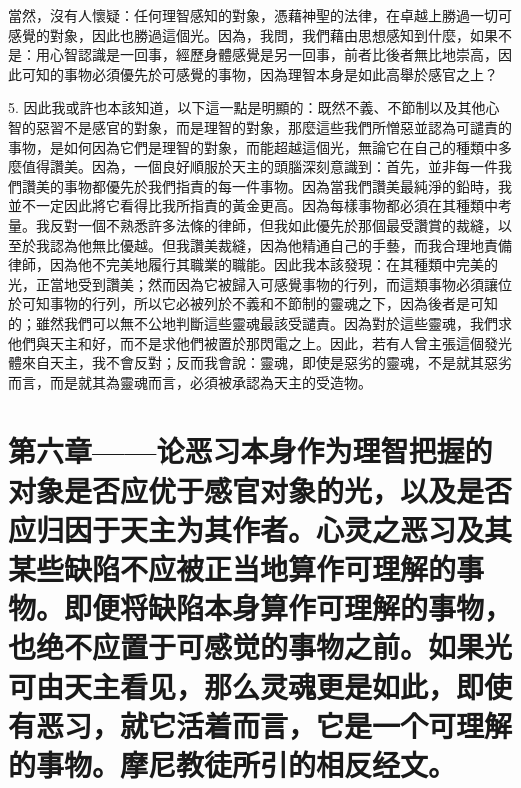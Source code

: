 當然，沒有人懷疑：任何理智感知的對象，憑藉神聖的法律，在卓越上勝過一切可感覺的對象，因此也勝過這個光。因為，我問，我們藉由思想感知到什麼，如果不是：用心智認識是一回事，經歷身體感覺是另一回事，前者比後者無比地崇高，因此可知的事物必須優先於可感覺的事物，因為理智本身是如此高舉於感官之上？\par

5. 因此我或許也本該知道，以下這一點是明顯的：既然不義、不節制以及其他心智的惡習不是感官的對象，而是理智的對象，那麼這些我們所憎惡並認為可譴責的事物，是如何因為它們是理智的對象，而能超越這個光，無論它在自己的種類中多麼值得讚美。因為，一個良好順服於天主的頭腦深刻意識到：首先，並非每一件我們讚美的事物都優先於我們指責的每一件事物。因為當我們讚美最純淨的鉛時，我並不一定因此將它看得比我所指責的黃金更高。因為每樣事物都必須在其種類中考量。我反對一個不熟悉許多法條的律師，但我如此優先於那個最受讚賞的裁縫，以至於我認為他無比優越。但我讚美裁縫，因為他精通自己的手藝，而我合理地責備律師，因為他不完美地履行其職業的職能。因此我本該發現：在其種類中完美的光，正當地受到讚美；然而因為它被歸入可感覺事物的行列，而這類事物必須讓位於可知事物的行列，所以它必被列於不義和不節制的靈魂之下，因為後者是可知的；雖然我們可以無不公地判斷這些靈魂最該受譴責。因為對於這些靈魂，我們求他們與天主和好，而不是求他們被置於那閃電之上。因此，若有人曾主張這個發光體來自天主，我不會反對；反而我會說：靈魂，即使是惡劣的靈魂，不是就其惡劣而言，而是就其為靈魂而言，必須被承認為天主的受造物。\par


\section{第六章——论恶习本身作为理智把握的对象是否应优于感官对象的光，以及是否应归因于天主为其作者。心灵之恶习及其某些缺陷不应被正当地算作可理解的事物。即便将缺陷本身算作可理解的事物，也绝不应置于可感觉的事物之前。如果光可由天主看见，那么灵魂更是如此，即使有恶习，就它活着而言，它是一个可理解的事物。摩尼教徒所引的相反经文。}

